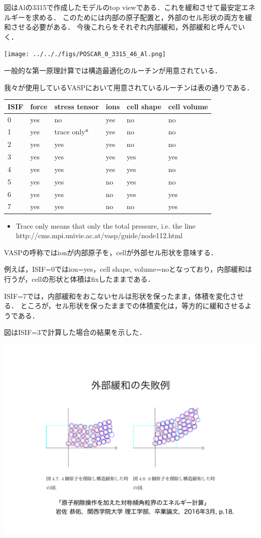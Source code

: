\documentclass[11pt,dvipdfmx]{jsarticle}
\providecommand{\tightlist}{%
      \setlength{\itemsep}{0pt}\setlength{\parskip}{0pt}}
\begin{document}
図はAlの3315で作成したモデルのtop
viewである．これを緩和させて最安定エネルギーを求める．
このためには内部の原子配置と，外部のセル形状の両方を緩和させる必要がある．
今後これらをそれぞれ内部緩和，外部緩和と呼んでいく．

\begin{center}
\texttt{[image: ../.././figs/POSCAR\_0\_3315\_46\_Al.png]}
\end{center}
一般的な第一原理計算では構造最適化のルーチンが用意されている．

\label{fig:This}
我々が使用しているVASPにおいて用意されているルーチンは表の通りである．

\begin{longtable}[]{@{}llllll@{}}
\toprule
ISIF & force & stress tensor & ions & cell shape & cell
volume\tabularnewline
\midrule
\endhead
0 & yes & no & yes & no & no\tabularnewline
1 & yes & trace only* & yes & no & no\tabularnewline
2 & yes & yes & yes & no & no\tabularnewline
3 & yes & yes & yes & yes & yes\tabularnewline
4 & yes & yes & yes & yes & no\tabularnewline
5 & yes & yes & no & yes & no\tabularnewline
6 & yes & yes & no & yes & yes\tabularnewline
7 & yes & yes & no & no & yes\tabularnewline
\bottomrule
\end{longtable}

\begin{itemize}
\tightlist
\item
  Trace only means that only the total pressure, i.e. the line
  http://cms.mpi.univie.ac.at/vasp/guide/node112.html
\end{itemize}

VASPの呼称ではionが内部原子を，cellが外部セル形状を意味する．

例えば，ISIF=0ではion=yes，cell shape,
volume=noとなっており，内部緩和は行うが，cellの形状と体積はfixしたままである．

ISIF=7では，内部緩和をおこないセルは形状を保ったまま，体積を変化させる．
ところが，セル形状を保ったままでの体積変化は，等方的に緩和させるようである．

図はISIF=3で計算した場合の結果を示した．
\begin{center}
\includegraphics[width=150mm]{../.././figs/thesis/thesis_004.jpeg}
\end{center}
\end{document}
